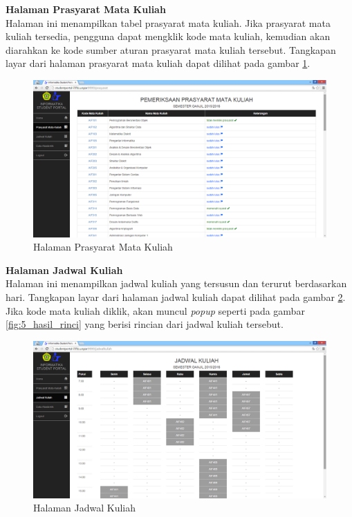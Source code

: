 				\textbf{Halaman Prasyarat Mata Kuliah}\\
				Halaman ini menampilkan tabel prasyarat mata kuliah. Jika prasyarat mata kuliah tersedia, pengguna dapat mengklik kode mata kuliah, kemudian akan diarahkan ke kode sumber aturan prasyarat mata kuliah tersebut. Tangkapan layar dari halaman prasyarat mata kuliah dapat dilihat pada gambar \ref{fig:5_hasil_prasyarat}.
					\begin{figure}[H]
						\centering
						\includegraphics[scale=0.5]{Gambar/hasil_prasyarat}
						\caption{Halaman Prasyarat Mata Kuliah} 
						\label{fig:5_hasil_prasyarat}
					\end{figure}

				\textbf{Halaman Jadwal Kuliah}\\
				Halaman ini menampilkan jadwal kuliah yang tersusun dan terurut berdasarkan hari. Tangkapan layar dari halaman jadwal kuliah dapat dilihat pada gambar \ref{fig:5_hasil_jadwal}. Jika kode mata kuliah diklik, akan muncul \textit{popup} seperti pada gambar \ref{fig:5_hasil_rinci} yang berisi rincian dari jadwal kuliah tersebut.
				\begin{figure}[H]
						\centering
						\includegraphics[scale=0.5]{Gambar/hasil_jadwal}
						\caption{Halaman Jadwal Kuliah} 
						\label{fig:5_hasil_jadwal}
					\end{figure}
					
